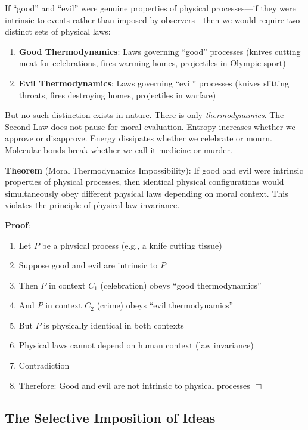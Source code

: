 \documentclass[11pt,a4paper]{article}
\begin{document}
If ``good'' and ``evil'' were genuine properties of physical processes—if they 
were intrinsic to events rather than imposed by observers—then we would 
require two distinct sets of physical laws:

\begin{enumerate}[leftmargin=2em]
\item \textbf{Good Thermodynamics}: Laws governing ``good'' processes (knives 
cutting meat for celebrations, fires warming homes, projectiles in Olympic 
sport)

\item \textbf{Evil Thermodynamics}: Laws governing ``evil'' processes (knives 
slitting throats, fires destroying homes, projectiles in warfare)
\end{enumerate}

But no such distinction exists in nature. There is only \emph{thermodynamics}. 
The Second Law does not pause for moral evaluation. Entropy increases whether 
we approve or disapprove. Energy dissipates whether we celebrate or mourn. 
Molecular bonds break whether we call it medicine or murder.

\textbf{Theorem} (Moral Thermodynamics Impossibility): If good and evil were 
intrinsic properties of physical processes, then identical physical 
configurations would simultaneously obey different physical laws depending on 
moral context. This violates the principle of physical law invariance.

\textbf{Proof}: 
\begin{enumerate}[label=(\arabic*)]
\item Let $P$ be a physical process (e.g., a knife cutting tissue)
\item Suppose good and evil are intrinsic to $P$
\item Then $P$ in context $C_1$ (celebration) obeys ``good thermodynamics''
\item And $P$ in context $C_2$ (crime) obeys ``evil thermodynamics''
\item But $P$ is physically identical in both contexts
\item Physical laws cannot depend on human context (law invariance)
\item Contradiction
\item Therefore: Good and evil are not intrinsic to physical processes $\Box$
\end{enumerate}

\subsection{The Selective Imposition of Ideas}
\end{document}
